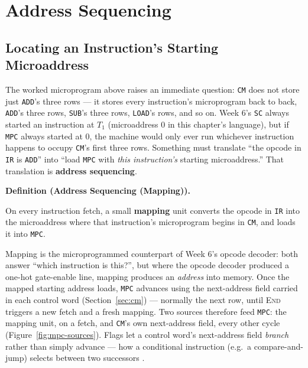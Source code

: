 \documentclass[11pt]{article}
\newenvironment{definitionbox}[1]{%
  \par\noindent\textbf{Definition (#1).}\ \itshape
}{\par\vspace{0.3em}}
\begin{document}
\section{Address Sequencing}
\label{sec:seq}

\subsection{Locating an Instruction's Starting Microaddress}

The worked microprogram above raises an immediate question: \texttt{CM} does not store just \texttt{ADD}'s three rows --- it stores every instruction's microprogram back to back, \texttt{ADD}'s three rows, \texttt{SUB}'s three rows, \texttt{LOAD}'s rows, and so on. Week 6's \texttt{SC} always started an instruction at $T_1$ (microaddress 0 in this chapter's language), but if \texttt{MPC} always started at 0, the machine would only ever run whichever instruction happens to occupy \texttt{CM}'s first three rows. Something must translate ``the opcode in \texttt{IR} is \texttt{ADD}'' into ``load \texttt{MPC} with \emph{this instruction's} starting microaddress.'' That translation is \textbf{address sequencing}.

\begin{definitionbox}{Address Sequencing (Mapping)}
On every instruction fetch, a small \textbf{mapping} unit converts the opcode in \texttt{IR} into the microaddress where that instruction's microprogram begins in \texttt{CM}, and loads it into \texttt{MPC}.
\end{definitionbox}

Mapping is the microprogrammed counterpart of Week 6's opcode decoder: both answer ``which instruction is this?'', but where the opcode decoder produced a one-hot gate-enable line, mapping produces an \emph{address} into memory. Once the mapped starting address loads, \texttt{MPC} advances using the next-address field carried in each control word (Section~\ref{sec:cm}) --- normally the next row, until \textsc{End} triggers a new fetch and a fresh mapping. Two sources therefore feed \texttt{MPC}: the mapping unit, on a fetch, and \texttt{CM}'s own next-address field, every other cycle (Figure~\ref{fig:mpc-sources}). Flags let a control word's next-address field \emph{branch} rather than simply advance --- how a conditional instruction (e.g.\ a compare-and-jump) selects between two successors \cite{Mano1993_computer_system_architecture}.
\end{document}
